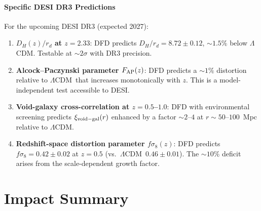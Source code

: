 \documentclass[11pt,a4paper]{article}
\newcommand{\LCDM}{$\Lambda$CDM}
\begin{document}
\subsection{Specific DESI DR3 Predictions}

For the upcoming DESI DR3 (expected 2027):
\begin{enumerate}
\item \textbf{$D_H(z)/r_d$ at $z = 2.33$}: DFD predicts
  $D_H/r_d = 8.72 \pm 0.12$, $\sim 1.5\%$ below \LCDM.
  Testable at $\sim 2\sigma$ with DR3 precision.

\item \textbf{Alcock--Paczynski parameter $F_{\rm AP}(z)$}: DFD
  predicts a $\sim 1\%$ distortion relative to \LCDM\ that increases
  monotonically with $z$. This is a model-independent test
  accessible to DESI.

\item \textbf{Void-galaxy cross-correlation at $z = 0.5$--$1.0$}:
  DFD with environmental screening predicts $\xi_{\rm void-gal}(r)$
  enhanced by a factor $\sim 2$--$4$ at $r \sim 50$--$100$~Mpc
  relative to \LCDM.

\item \textbf{Redshift-space distortion parameter $f\sigma_8(z)$}:
  DFD predicts $f\sigma_8 = 0.42 \pm 0.02$ at $z = 0.5$ (vs.\
  \LCDM\ $0.46 \pm 0.01$). The $\sim 10\%$ deficit arises from
  the scale-dependent growth factor.
\end{enumerate}


\part{Impact Summary}
\label{part:impact}
\end{document}
